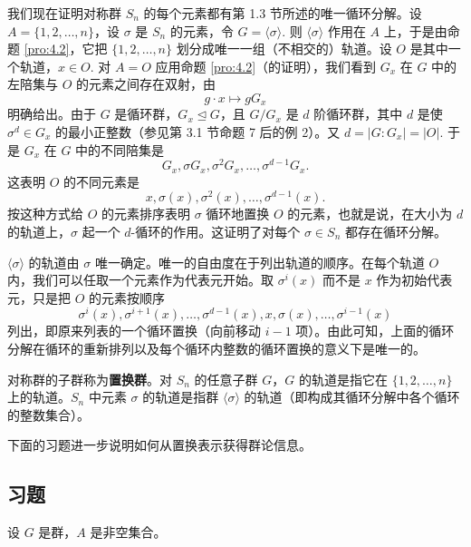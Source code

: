 我们现在证明对称群 \(S_n\) 的每个元素都有第 1.3 节所述的唯一循环分解。设 \(A = \{1, 2, \ldots, n\}\)，设 \(\sigma\) 是 \(S_n\) 的元素，令 \(G = \langle \sigma \rangle\). 则 \(\langle \sigma \rangle\) 作用在 \(A\) 上，于是由命题 \ref{pro:4.2}，它把 \(\{1, 2, \ldots, n\}\) 划分成唯一一组（不相交的）轨道。设 \(O\) 是其中一个轨道，\(x \in O\). 对 \(A = O\) 应用命题 \ref{pro:4.2}（的证明），我们看到 \(G_x\) 在 \(G\) 中的左陪集与 \(O\) 的元素之间存在双射，由
\[
g \cdot x \longmapsto gG_x
\]
明确给出。由于 \(G\) 是循环群，\(G_x \trianglelefteq G\)，且 \(G/G_x\) 是 \(d\) 阶循环群，其中 \(d\) 是使 \(\sigma^d \in G_x\) 的最小正整数（参见第 3.1 节命题 7 后的例 2）。又 \(d = |G : G_x| = |O|\). 于是 \(G_x\) 在 \(G\) 中的不同陪集是
\[
G_x, \sigma G_x, \sigma^2 G_x, \ldots, \sigma^{d-1}G_x.
\]
这表明 \(O\) 的不同元素是
\[
x, \sigma(x), \sigma^2(x), \ldots, \sigma^{d-1}(x).
\]
按这种方式给 \(O\) 的元素排序表明 \(\sigma\) 循环地置换 \(O\) 的元素，也就是说，在大小为 \(d\) 的轨道上，\(\sigma\) 起一个 \(d\)-循环的作用。这证明了对每个 \(\sigma \in S_n\) 都存在循环分解。

\(\langle \sigma \rangle\) 的轨道由 \(\sigma\) 唯一确定。唯一的自由度在于列出轨道的顺序。在每个轨道 \(O\) 内，我们可以任取一个元素作为代表元开始。取 \(\sigma^i(x)\) 而不是 \(x\) 作为初始代表元，只是把 \(O\) 的元素按顺序
\[
\sigma^i(x), \sigma^{i+1}(x), \ldots, \sigma^{d-1}(x), x, \sigma(x), \ldots, \sigma^{i-1}(x)
\]
列出，即原来列表的一个循环置换（向前移动 \(i-1\) 项）。由此可知，上面的循环分解在循环的重新排列以及每个循环内整数的循环置换的意义下是唯一的。

对称群的子群称为\textbf{置换群}。对 \(S_n\) 的任意子群 \(G\)，\(G\) 的轨道是指它在 \(\{1, 2, \ldots, n\}\) 上的轨道。\(S_n\) 中元素 \(\sigma\) 的轨道是指群 \(\langle \sigma \rangle\) 的轨道（即构成其循环分解中各个循环的整数集合）。

下面的习题进一步说明如何从置换表示获得群论信息。

\subsection*{习题}
设 \(G\) 是群，\(A\) 是非空集合。

